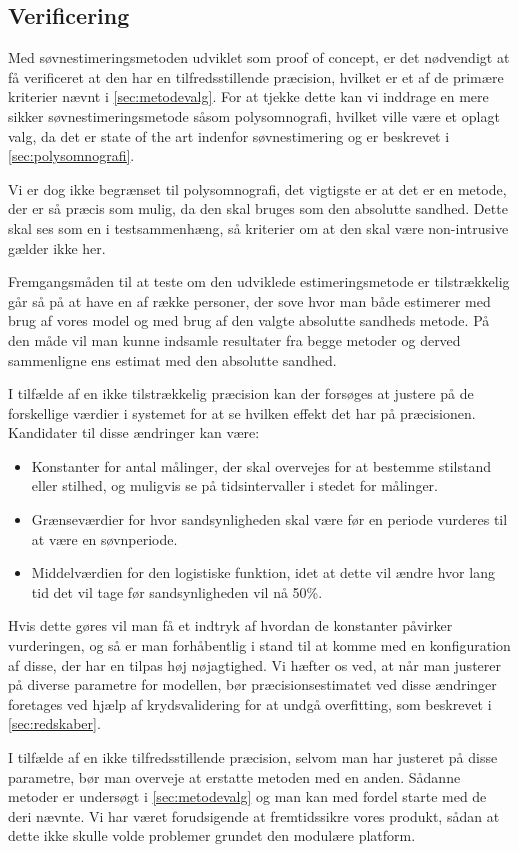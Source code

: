 \subsection{Verificering}
Med søvnestimeringsmetoden udviklet som proof of concept, er det nødvendigt at få verificeret at den har en tilfredsstillende præcision, hvilket er et af de primære kriterier nævnt i \cref{sec:metodevalg}.
For at tjekke dette kan vi inddrage en mere sikker søvnestimeringsmetode såsom polysomnografi, hvilket ville være et oplagt valg, da det er state of the art indenfor søvnestimering og er beskrevet i \cref{sec:polysomnografi}.

Vi er dog ikke begrænset til polysomnografi, det vigtigste er at det er en metode, der er så præcis som mulig, da den skal bruges som den absolutte sandhed.
Dette skal ses som en i testsammenhæng, så kriterier om at den skal være non-intrusive gælder ikke her.

Fremgangsmåden til at teste om den udviklede estimeringsmetode er tilstrækkelig går så på at have en af række personer, der sove hvor man både estimerer med brug af vores model og med brug af den valgte absolutte sandheds metode.
På den måde vil man kunne indsamle resultater fra begge metoder og derved sammenligne ens estimat med den absolutte sandhed.

I tilfælde af en ikke tilstrækkelig præcision kan der forsøges at justere på de forskellige værdier i systemet for at se hvilken effekt det har på præcisionen.
Kandidater til disse ændringer kan være:
\begin{itemize}
	\item Konstanter for antal målinger, der skal overvejes for at bestemme stilstand eller stilhed, og muligvis se på tidsintervaller i stedet for målinger.
	\item Grænseværdier for hvor sandsynligheden skal være før en periode vurderes til at være en søvnperiode.
	\item Middelværdien for den logistiske funktion, idet at dette vil ændre hvor lang tid det vil tage før sandsynligheden vil nå 50\%.
\end{itemize} 

Hvis dette gøres vil man få et indtryk af hvordan de konstanter påvirker vurderingen, og så er man forhåbentlig i stand til at komme med en konfiguration af disse, der har en tilpas høj nøjagtighed.
Vi hæfter os ved, at når man justerer på diverse parametre for modellen, bør præcisionsestimatet ved disse ændringer foretages ved hjælp af krydsvalidering for at undgå overfitting, som beskrevet i \cref{sec:redskaber}.

I tilfælde af en ikke tilfredsstillende præcision, selvom man har justeret på disse parametre, bør man overveje at erstatte metoden med en anden.
Sådanne metoder er undersøgt i \cref{sec:metodevalg} og man kan med fordel starte med de deri nævnte.
Vi har været forudsigende at fremtidssikre vores produkt, sådan at dette ikke skulle volde problemer grundet den modulære platform.